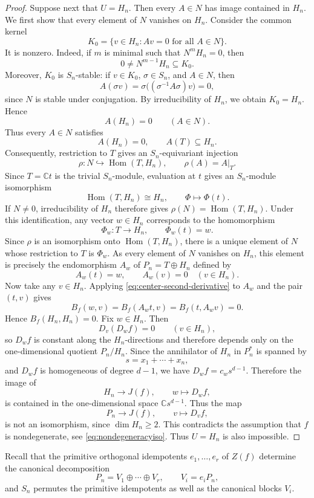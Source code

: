 \documentclass[11pt,reqno]{amsart}
\numberwithin{equation}{section}
\theoremstyle{definition}
\theoremstyle{remark}
\newcommand{\C}{\mathbb C}
\newcommand{\Hom}{\operatorname{Hom}}
\begin{document}
\begin{proof}
Suppose next that $U=H_n$. Then every $A\in N$ has image contained in $H_n$.  We first show
that every element of $N$ vanishes on $H_n$. Consider the common kernel
\[
  K_0=
  \{v\in H_n:Av=0\text{ for all }A\in N\}.
\]
It is nonzero.  Indeed, if $m$ is minimal such that $N^mH_n=0$, then
\[
  0\ne N^{m-1}H_n\subseteq K_0.
\]
Moreover, $K_0$ is $S_n$-stable: if $v\in K_0$, $\sigma\in S_n$,
and $A\in N$, then
\[
  A(\sigma v)
  =
  \sigma\bigl((\sigma^{-1}A\sigma)v\bigr)
  =
  0,
\]
since $N$ is stable under conjugation.  By irreducibility of $H_n$,
we obtain $K_0=H_n$. Hence
\[
  A(H_n)=0
  \qquad(A\in N).
\]
Thus every $A\in N$ satisfies
\[
  A(H_n)=0,
  \qquad
  A(T)\subseteq H_n.
\]
Consequently, restriction to $T$ gives an $S_n$-equivariant
injection
\[
  \rho:N\hookrightarrow\Hom(T,H_n),
  \qquad
  \rho(A)=A|_T.
\]
Since $T=\C t$ is the trivial $S_n$-module, evaluation at $t$ gives
an $S_n$-module isomorphism
\[
  \Hom(T,H_n)\cong H_n,
  \qquad
  \Phi\longmapsto\Phi(t).
\]
If $N\ne0$, irreducibility of $H_n$ therefore gives $ \rho(N)=\Hom(T,H_n)$. Under this identification, any vector $w\in H_n$ corresponds to
the homomorphism
\[
  \Phi_w:T\longrightarrow H_n,
  \qquad
  \Phi_w(t)=w.
\]
Since $\rho$ is an isomorphism onto $\Hom(T,H_n)$, there is a unique
element of $N$ whose restriction to $T$ is $\Phi_w$.  As every
element of $N$ vanishes on $H_n$, this element is precisely the
endomorphism $A_w$ of $P_n=T\oplus H_n$ defined by
\[
  A_w(t)=w,
  \qquad
  A_w(v)=0
  \quad(v\in H_n).
\]
Now take any $v\in H_n$.  Applying
\eqref{eq:center-second-derivative} to $A_w$ and the pair $(t,v)$
gives
\[
  B_f(w,v)
  =
  B_f(A_wt,v)
  =
  B_f(t,A_wv)
  =
  0.
\]
Hence  $B_f(H_n,H_n)=0$. Fix $w\in H_n$.  Then
\[
  D_v(D_wf)=0
  \qquad(v\in H_n),
\]
so $D_wf$ is constant along the $H_n$-directions and therefore
depends only on the one-dimensional quotient $P_n/H_n$.  Since the
annihilator of $H_n$ in $P_n^*$ is spanned by
\[
  s=x_1+\cdots+x_n,
\]
and $D_wf$ is homogeneous of degree $d-1$, we have $ D_wf=c_ws^{d-1}$. Therefore the image of
\[
  H_n\longrightarrow J(f),
  \qquad
  w\longmapsto D_wf,
\]
is contained in the one-dimensional space $\C s^{d-1}$.  Thus the map
\[
  P_n\longrightarrow J(f),
  \qquad
  v\longmapsto D_vf,
\]
is not an isomorphism, since $\dim H_n\geq 2$. This  contradicts  the assumption that $f$ is nondegenerate, see \eqref{eq:nondegeneracyiso}. Thus  $U=H_n$ is also impossible.
\end{proof}


Recall that the primitive orthogonal idempotents $e_1,\dots,e_r$ of $Z(f)$ determine the canonical decomposition
\[
  P_n=V_1\oplus\cdots\oplus V_r,
  \qquad
  V_i=e_iP_n,
\]
and  $S_n$ permutes the primitive idempotents as well as the canonical blocks $V_i$.
\end{document}
